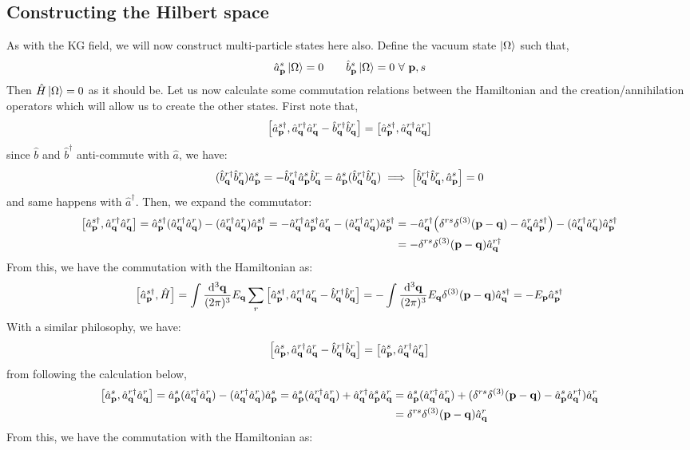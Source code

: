 \subsection{Constructing the Hilbert space}
As with the KG field, we will now construct multi-particle states here also. Define the vacuum state $\ket{\Omega}$ such that,
$$\annap\vac = 0\qquad \annbp\vac=0 \ \forall \ \vb{p}, s $$
Then $\hat{H}\vac = 0$ as it should be. Let us now calculate some commutation relations between the Hamiltonian and the creation/annihilation operators which will allow us to create the other states. First note that,
\begin{align*}
    \comtr{\creap}{\creaqr \annaqr-\crebqr\annbqr} = \comtr{\creap}{\creaqr \annaqr}
\end{align*}
since $\hat{b}$ and $\hat{b}^\dagger$ anti-commute with $\hat{a}$, we have:
$$(\crebqr \annbqr) \annap = - \crebqr \annap \annbqr =\annap (\crebqr \annbqr) \implies \comtr{\crebqr \annbqr}{ \annap }=0$$
and same happens with $\hat{a}^\dagger$. Then, we expand the commutator:
\begin{align*}
     \comtr{\creap}{\creaqr \annaqr} = \creap(\creaqr \annaqr )- (\creaqr \annaqr )\creap=-\creaqr\creap \annaqr - (\creaqr \annaqr )\creap&=-\creaqr\qty( \delta^{rs}\ddelt{\vb{p}-\vb{q}} -\annaqr\creap)-(\creaqr \annaqr )\creap\\
     &=-\delta^{rs}\ddelt{\vb{p}-\vb{q}}\creaqr 
\end{align*}
From this, we have the commutation with the Hamiltonian as:
\begin{align*}
   \comtr{\creap}{\hat{H}} = \int \meas{\vb{q}}E_{\vb{q}}\sum_{r} \comtr{\creap}{\creaqr \annaqr-\crebqr\annbqr}= -\int \meas{\vb{q}}E_{\vb{q}}\ddelt{\vb{p}-\vb{q}}\creaq = -E_{\vb{p}} \creap
\end{align*}
With a similar philosophy, we have:
\begin{align*}
    \comtr{\annap}{\creaqr \annaqr-\crebqr\annbqr} = \comtr{\annap}{\creaqr \annaqr}
\end{align*}
from following the calculation below,
\begin{align*}
     \comtr{\annap}{\creaqr \annaqr}= \annap(\creaqr \annaqr )- (\creaqr \annaqr )\annap=\annap(\creaqr \annaqr ) +\creaqr \annap\annaqr&=\annap(\creaqr \annaqr ) +(\delta^{rs}\ddelt{\vb{p}-\vb{q}} - \annap\creaqr)\annaqr\\&=\delta^{rs}\ddelt{\vb{p}-\vb{q}}\annaqr
\end{align*}
From this, we have the commutation with the Hamiltonian as:
